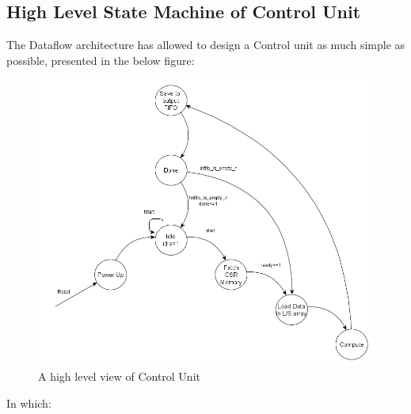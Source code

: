 \subsection{High Level State Machine of Control Unit}
The Dataflow architecture has allowed to design a Control unit as much simple as possible, presented in the below figure:
\begin{figure}[H]
\centering
\captionsetup{justification=centering}
\includegraphics[scale=0.5,angle=0]{./figure/cu.png}
\caption{A high level view of Control Unit}
\label{fig:cu}
\end{figure} 
In which:

